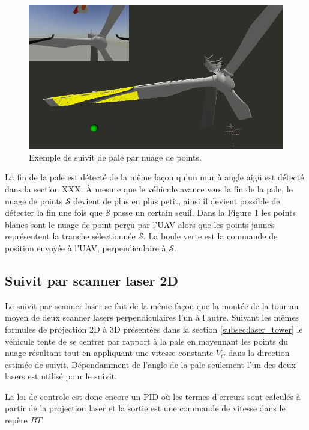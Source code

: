 \begin{figure}[htp]
  \centering
  \includegraphics[width=0.7\linewidth]{images/suivit_nuage_points.png}
  \caption{Exemple de suivit de pale par nuage de points.}
  \label{fig:pcl_blade_follow}
\end{figure}

La fin de la pale est détecté de la même façon qu'un mur à angle aigü est détecté dans la section \color{red}XXX\color{black}. À mesure que le véhicule avance vers la fin de la pale, le nuage de points $\mathcal{S}$ devient de plus en plus petit, ainsi il devient possible de détecter la fin une fois que $\mathcal{S}$ passe un certain seuil. Dans la Figure \ref{fig:pcl_blade_follow} les points blancs sont le nuage de point perçu par l'UAV alors que les points jaunes représentent la tranche sélectionnée $\mathcal{S}$. La boule verte est la commande de position envoyée à l'UAV, perpendiculaire à $\mathcal{S}$.

\subsection{Suivit par scanner laser 2D}
\label{subsec:laser_blade}

Le suivit par scanner laser se fait de la même façon que la montée de la tour au moyen de deux scanner lasers perpendiculaires l'un à l'autre. Suivant les mêmes formules de projection 2D à 3D présentées dans la section \ref{subsec:laser_tower} le véhicule tente de se centrer par rapport à la pale en moyennant les points du nuage résultant tout en appliquant une vitesse constante $V_C$ dans la direction estimée de suivit. Dépendamment de l'angle de la pale seulement l'un des deux lasers est utilisé pour le suivit.

La loi de controle est donc encore un PID où les termes d'erreurs sont calculés à partir de la projection laser et la sortie est une commande de vitesse dans le repère ${BT}$.

